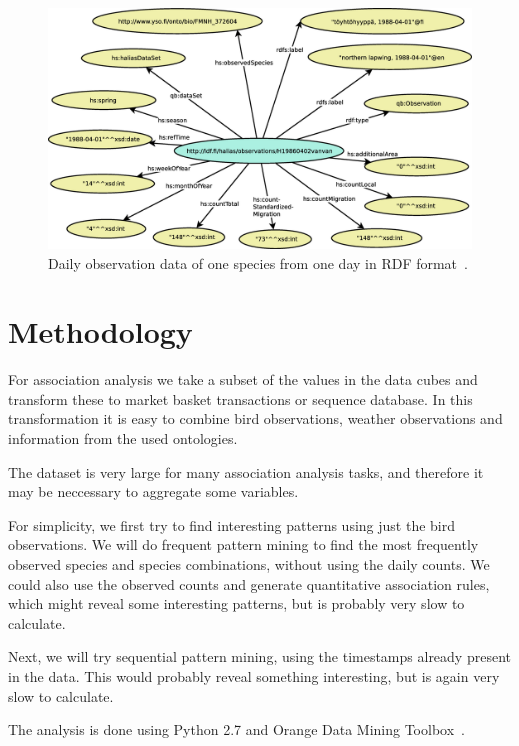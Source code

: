 \documentclass[english]{tktltiki2}
\begin{document}
\begin{figure}[htb]
\centering
\includegraphics[clip=true, width=\textwidth]{havaintograafi}
\caption{Daily observation data of one species from one day in RDF format~\cite{koho2015gradu}.}
\label{fig: havaintograafi}
\end{figure}



\section{Methodology}

For association analysis we take a subset of the values in the data cubes and transform these to market basket transactions or sequence database. In this transformation it is easy to combine bird observations, weather observations and information from the used ontologies.

The dataset is very large for many association analysis tasks, and therefore it may be neccessary to aggregate some variables.

For simplicity, we first try to find interesting patterns using just the bird observations. We will do frequent pattern mining to find the most frequently observed species and species combinations, without using the daily counts. We could also use the observed counts and generate quantitative association rules, which might reveal some interesting patterns, but is probably very slow to calculate.

Next, we will try sequential pattern mining, using the timestamps already present in the data. This would probably reveal something interesting, but is again very slow to calculate.

The analysis is done using Python 2.7 and Orange Data Mining Toolbox~\cite{Orange}.
\end{document}
